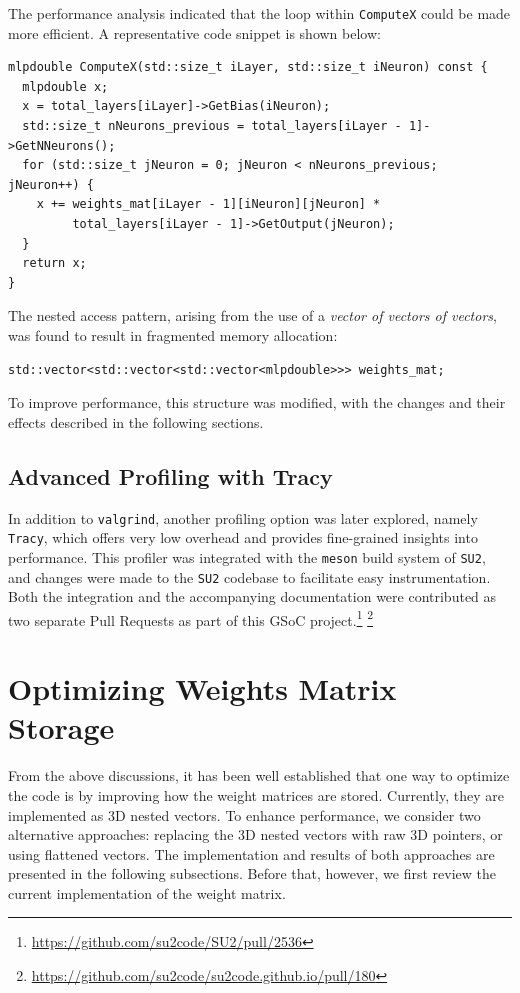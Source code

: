 \documentclass{article}
\begin{document}
The performance analysis indicated that the loop within 
\texttt{ComputeX} could be made more efficient. A representative code snippet 
is shown below:

\begin{verbatim}
mlpdouble ComputeX(std::size_t iLayer, std::size_t iNeuron) const {
  mlpdouble x;
  x = total_layers[iLayer]->GetBias(iNeuron);
  std::size_t nNeurons_previous = total_layers[iLayer - 1]->GetNNeurons();
  for (std::size_t jNeuron = 0; jNeuron < nNeurons_previous; jNeuron++) {
    x += weights_mat[iLayer - 1][iNeuron][jNeuron] *
         total_layers[iLayer - 1]->GetOutput(jNeuron);
  }
  return x;
}
\end{verbatim}

The nested access pattern, arising from the use of a \emph{vector of vectors of vectors}, was found to result in fragmented memory allocation:
\begin{verbatim}
std::vector<std::vector<std::vector<mlpdouble>>> weights_mat;
\end{verbatim}
To improve performance, this structure was modified, with the changes and their effects described in the following sections.

\subsection{Advanced Profiling with Tracy}

In addition to \texttt{valgrind}, another profiling option was later 
explored, namely \texttt{Tracy}, which offers very low overhead and provides 
fine-grained insights into performance. This profiler was integrated with the 
\texttt{meson} build system of \texttt{SU2}, and changes were made to the 
\texttt{SU2} codebase to facilitate easy instrumentation. Both the integration 
and the accompanying documentation were contributed as two separate Pull Requests 
as part of this GSoC project.\footnote{\url{https://github.com/su2code/SU2/pull/2536}}%
\footnote{\url{https://github.com/su2code/su2code.github.io/pull/180}}

\section{Optimizing Weights Matrix Storage}
\label{sec:weights}
From the above discussions, it has been well established that one way to optimize the code is by improving how the weight matrices are stored. Currently, they are implemented as 3D nested vectors. To enhance performance, we consider two alternative approaches: replacing the 3D nested vectors with raw 3D pointers, or using flattened vectors. The implementation and results of both approaches are presented in the following subsections. Before that, however, we first review the current implementation of the weight matrix.
\end{document}
